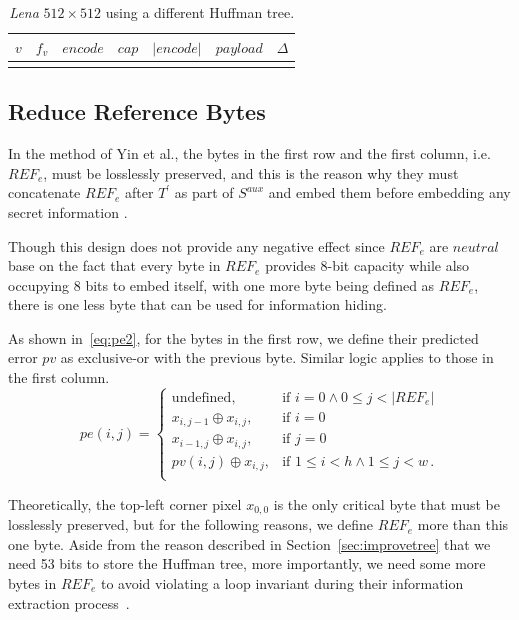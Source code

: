 \begin{table}
	\centering
	\caption{\emph{Lena} $512 \times 512$ using a different Huffman tree.}
	
	\begin{tabular}{crlcccr}
		\toprule 
		$v$ &   \multicolumn{1}{c}{$f_v$} &     \multicolumn{1}{c}{$encode$}  &  $cap$ &    $\vert encode \vert$    & $payload$  & $\Delta$ \\
		\midrule  
		\singlelenashr
		\bottomrule   
	\end{tabular}
	
	\label{tab:shrlena}
\end{table}

\subsection{Reduce Reference Bytes}
\label{sec:improveref}

In the method of Yin et al.,
the bytes in the first row and the first column, i.e.\ $REF_e$, must be losslessly preserved, and this is the reason why they must concatenate $REF_e$ after $T^\prime$ as part of $S^{aux}$ and embed them before embedding any secret information 
. 

Though this design does not provide any negative effect since $REF_e$ are $neutral$ base on the fact that every byte in $REF_e$ provides 8-bit capacity while also occupying 8 bits to embed itself, with one more byte being defined as $REF_e$, there is one less byte that can be used for information hiding. 

As shown in~\eqref{eq:pe2}, 
for the bytes in the first row, we define their predicted error $pv$ as exclusive-or with the previous byte. 
Similar logic applies to those in the first column. 
\begin{equation}
	\label{eq:pe2}
	pe(i, j) = 
	\begin{cases}
		\text{undefined},             & \text{if } i = 0 \wedge  0 \leq j < |REF_e| \\
		x_{i, j - 1} \oplus x_{i, j}, & \text{if } i = 0 \\
		x_{i - 1, j} \oplus x_{i, j}, & \text{if } j = 0 \\
		pv(i, j) \oplus x_{i, j}, 	  & \text{if } 1 \leq i < h \wedge 1 \leq j < w\,. \\
	\end{cases} 
\end{equation}

Theoretically, the top-left corner pixel $x_{0, 0}$ is the only critical byte that must be losslessly preserved, but for the following reasons, we define $REF_e$ more than this one byte.
Aside from the reason described in Section~\ref{sec:improvetree} that we need 53 bits to store the Huffman tree, 
more importantly, we need some more bytes in $REF_e$ to avoid violating a loop invariant during 
their information extraction process~\cite{Furia2014}.

